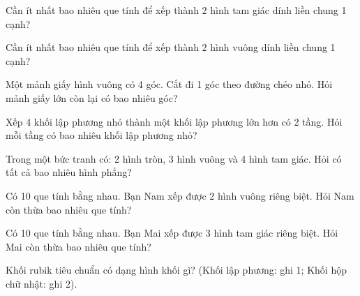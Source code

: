 \begin{ex}
Cần ít nhất bao nhiêu que tính để xếp thành 2 hình tam giác dính liền chung 1 cạnh?
\end{ex}

\begin{ex}
Cần ít nhất bao nhiêu que tính để xếp thành 2 hình vuông dính liền chung 1 cạnh?
\end{ex}

\begin{ex}
Một mảnh giấy hình vuông có 4 góc. Cắt đi 1 góc theo đường chéo nhỏ. Hỏi mảnh giấy lớn còn lại có bao nhiêu góc?
\end{ex}

\begin{ex}
Xếp 4 khối lập phương nhỏ thành một khối lập phương lớn hơn có 2 tầng. Hỏi mỗi tầng có bao nhiêu khối lập phương nhỏ?
\end{ex}

\begin{ex}
Trong một bức tranh có: 2 hình tròn, 3 hình vuông và 4 hình tam giác. Hỏi có tất cả bao nhiêu hình phẳng?
\end{ex}

\begin{ex}
Có 10 que tính bằng nhau. Bạn Nam xếp được 2 hình vuông riêng biệt. Hỏi Nam còn thừa bao nhiêu que tính?
\end{ex}

\begin{ex}
Có 10 que tính bằng nhau. Bạn Mai xếp được 3 hình tam giác riêng biệt. Hỏi Mai còn thừa bao nhiêu que tính?
\end{ex}

\begin{ex}
Khối rubik tiêu chuẩn có dạng hình khối gì? (Khối lập phương: ghi 1; Khối hộp chữ nhật: ghi 2).
\end{ex}

